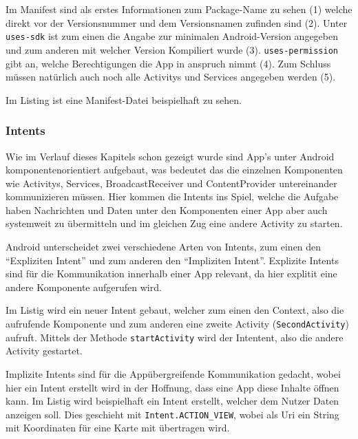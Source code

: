 Im Manifest sind als erstes Informationen zum Package-Name zu sehen (1) welche direkt vor der Versionsnummer und dem Versionsnamen zufinden sind (2). Unter \texttt{uses-sdk} ist zum einen die Angabe zur minimalen Android-Version angegeben und zum anderen mit welcher Version Kompiliert wurde (3). \texttt{uses-permission} gibt an, welche Berechtigungen die App in anspruch nimmt (4). Zum Schluss m\"ussen nat\"urlich auch noch alle Activitys und Services angegeben werden (5).
\cite{Android44}

Im Listing ist eine Manifest-Datei beispielhaft zu sehen.



\subsubsection{Intents} \label{Intents}
Wie im Verlauf dieses Kapitels schon gezeigt wurde sind App's unter Android komponentenorientiert aufgebaut, was bedeutet das die einzelnen Komponenten wie Activitys, Services, BroadcastReceiver und ContentProvider untereinander kommunizieren m\"ussen. Hier kommen die Intents ins Spiel, welche die Aufgabe haben Nachrichten und Daten unter den Komponenten einer App aber auch systemweit zu \"ubermitteln und im gleichen Zug eine andere Activity zu starten.

Android unterscheidet zwei verschiedene Arten von Intents, zum einen den "`Expliziten Intent"' und zum anderen den "`Impliziten Intent"'. Explizite Intents sind f\"ur die Kommunikation innerhalb einer App relevant, da hier explitit eine andere Komponente aufgerufen wird. 

Im Listig wird ein neuer Intent gebaut, welcher zum einen den Context, also die aufrufende Komponente und zum anderen eine zweite Activity (\texttt{SecondActivity}) aufruft. Mittels der Methode \texttt{startActivity} wird der Intentent, also die andere Activity gestartet.



Implizite Intents sind f\"ur die App\"ubergreifende Kommunikation gedacht, wobei hier ein Intent erstellt wird in der Hoffnung, dass eine App diese Inhalte \"offnen kann.
Im Listig wird beispielhaft ein Intent erstellt, welcher dem Nutzer Daten anzeigen soll. Dies geschieht mit \texttt{Intent.ACTION\_VIEW}, wobei als Uri ein String mit Koordinaten f\"ur eine Karte mit \"ubertragen wird.




